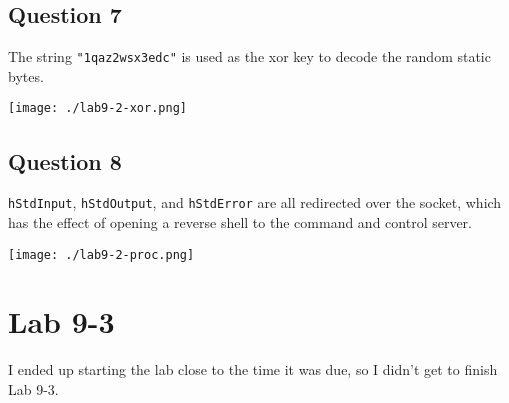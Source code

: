 \documentclass[11pt]{article}
\begin{document}
\subsection{Question 7}
\label{sec:org979d217}
The string \texttt{"1qaz2wsx3edc"} is used as the xor key to decode the
random static bytes.

\begin{center}
\texttt{[image: ./lab9-2-xor.png]}
\end{center}
\subsection{Question 8}
\label{sec:orge3e6b3a}
\texttt{hStdInput}, \texttt{hStdOutput}, and \texttt{hStdError} are all redirected over the
socket, which has the effect of opening a reverse shell to the command
and control server.

\begin{center}
\texttt{[image: ./lab9-2-proc.png]}
\end{center}
\section{Lab 9-3}
\label{sec:orgd301bba}
I ended up starting the lab close to the time it was due, so I didn't
get to finish Lab 9-3.
\end{document}
